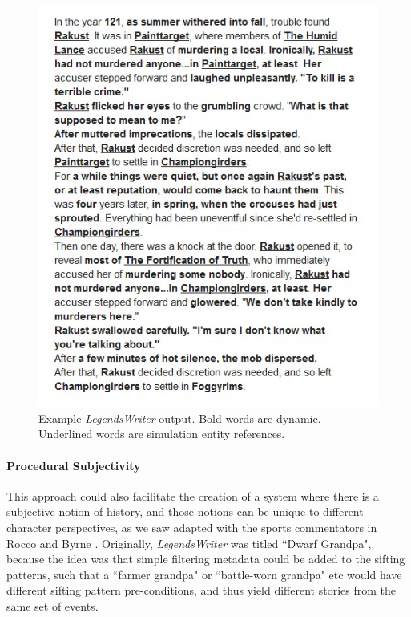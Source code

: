 \begin{figure}
    \centering
    \includegraphics[width=\textwidth]{figures/4-Delve/legendswriter-output.jpg}
    \caption{Example \textit{LegendsWriter} output. Bold words are dynamic. Underlined words are simulation entity references.}
    \label{fig:legendswriter-output}
\end{figure}


\paragraph{Procedural Subjectivity}\label{par:procedural-subjectivity}

This approach could also facilitate the creation of a system where there is a subjective notion of history, and those notions can be unique to different character perspectives, as we saw adapted with the sports commentators in Rocco and Byrne \cite{andre2000three}. Originally, \textit{LegendsWriter} was titled ``Dwarf Grandpa", because the idea was that simple filtering metadata could be added to the sifting patterns, such that a ``farmer grandpa" or ``battle-worn grandpa" etc would have different sifting pattern pre-conditions, and thus yield different stories from the same set of events.

